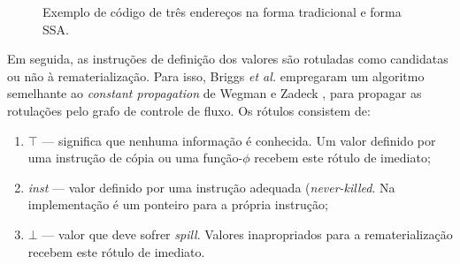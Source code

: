 \documentclass[
	12pt,				%
	openright,			%
	oneside,			%
	a4paper,			%
	tccpreliminar,			%
	]{ABNT-DC-UEL}
\begin{document}
\begin{figure}[h]
\begin{subfigure}
        \caption{O mesmo grafo na forma SSA, onde $y_3$ pode receber o valor de $y_1$ ou $y_2$.}
        \label{ssa-2}
    \end{subfigure}
    \caption{Exemplo de código de três endereços na forma tradicional e forma SSA.}
\end{figure}

Em seguida, as instruções de definição dos valores são rotuladas como candidatas ou não à rematerialização. Para isso, Briggs \textit{et al.} empregaram um algoritmo semelhante ao \textit{constant propagation} de Wegman e Zadeck \cite{wegman:91}, para propagar as rotulações pelo grafo de controle de fluxo. Os rótulos consistem de:
\begin{enumerate}
    \item $\top$ --- significa que nenhuma informação é conhecida. Um valor definido por uma instrução de cópia ou uma função-$\phi$ recebem este rótulo de imediato;
    \item \textit{inst} --- valor definido por uma instrução adequada (\textit{never-killed}. Na implementação é um ponteiro para a própria instrução;
    \item $\bot$ --- valor que deve sofrer \textit{spill}. Valores inapropriados para a rematerialização recebem este rótulo de imediato.
\end{enumerate}
\end{document}
